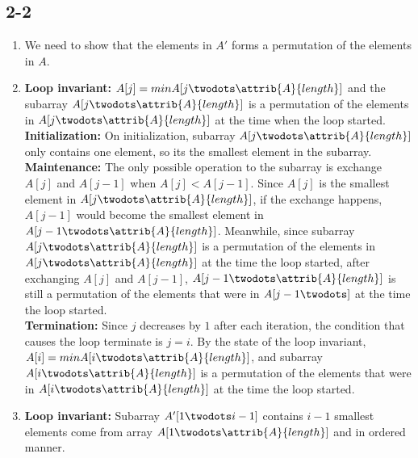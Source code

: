 \subsection{2-2}
\begin{enumerate}[leftmargin=*]
    \item We need to show that the elements in $A'$ forms a permutation
        of the elements in $A$.
    \item \textbf{Loop invariant:} $A[j]=min{A[j\twodots \attrib{A}{length}]}$
        and the subarray $A[j\twodots \attrib{A}{length}]$ is a permutation of
        the elements in $A[j\twodots \attrib {A}{length}]$ at the time when
        the loop started. \\

        \textbf{Initialization:} On initialization, subarray
        $A[j\twodots \attrib{A}{length}]$ only contains one element, so its
        the smallest element in the subarray. \\

        \textbf{Maintenance:} The only possible operation to the subarray is
        exchange $A[j]$ and $A[j-1]$ when $A[j]<A[j-1]$. Since $A[j]$ is the
        smallest element in $A[j\twodots \attrib{A}{length}]$, if the exchange
        happens, $A[j-1]$ would become the smallest element in $A[j-1\twodots
        \attrib{A}{length}]$. Meanwhile, since subarray
        $A[j\twodots \attrib{A}{length}]$ is a permutation of the elements in
        $A[j\twodots \attrib{A}{length}]$ at the time the loop started, after
        exchanging $A[j]$ and $A[j-1]$, $A[j-1\twodots \attrib{A}{length}]$ is
        still a permutation of the elements that were in $A[j-1\twodots]$
        at the time the loop started. \\

        \textbf{Termination:} Since $j$ decreases by $1$ after each iteration,
        the condition that causes the loop terminate is $j=i$. By the state of
        the loop invariant, $A[i]=min{A[i\twodots \attrib {A}{length}]}$, and
        subarray $A[i\twodots \attrib{A}{length}]$ is a permutation of the
        elements that were in $A[i\twodots \attrib {A}{length}]$ at the time
        the loop started.
    \item \textbf{Loop invariant:} Subarray $A'[1\twodots i-1]$ contains $i-1$
        smallest elements come from array $A[1\twodots \attrib{A}{length}]$
        and in ordered manner. \\


\end{enumerate}
